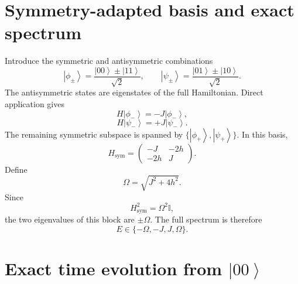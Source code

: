 \documentclass[11pt,a4paper]{article}
\newcommand{\ket}[1]{\left|#1\right\rangle}
\newcommand{\I}{\mathbb{I}}
\begin{document}
\section{Symmetry-adapted basis and exact spectrum}

Introduce the symmetric and antisymmetric combinations
\begin{equation}
\ket{\phi_\pm}=\frac{\ket{00}\pm\ket{11}}{\sqrt{2}},\qquad
\ket{\psi_\pm}=\frac{\ket{01}\pm\ket{10}}{\sqrt{2}}.
\end{equation}
The antisymmetric states are eigenstates of the full Hamiltonian. Direct application gives
\begin{equation}
H\ket{\phi_-}=-J\ket{\phi_-},
\end{equation}
\begin{equation}
H\ket{\psi_-}=+J\ket{\psi_-}.
\end{equation}
The remaining symmetric subspace is spanned by $\{\ket{\phi_+},\ket{\psi_+}\}$. In this basis,
\begin{equation}
H_{\mathrm{sym}}=
\begin{pmatrix}
-J&-2h\\
-2h&J
\end{pmatrix}.
\end{equation}
Define
\begin{equation}
\Omega=\sqrt{J^2+4h^2}.
\end{equation}
Since
\begin{equation}
H_{\mathrm{sym}}^2=\Omega^2\I,
\end{equation}
the two eigenvalues of this block are $\pm\Omega$. The full spectrum is therefore
\begin{equation}
\boxed{E\in\{-\Omega,-J,J,\Omega\}}.
\end{equation}

\section{Exact time evolution from \texorpdfstring{$\ket{00}$}{|00>}}
\end{document}
